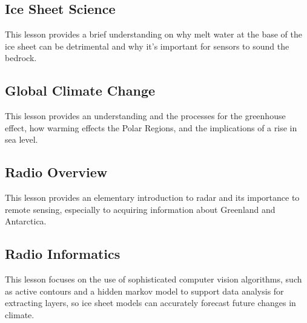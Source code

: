 \subsection{Ice Sheet Science}\label{ice-sheet-science}

This lesson provides a brief understanding on why melt water at the base
of the ice sheet can be detrimental and why it's important for sensors
to sound the bedrock.


\subsection{Global Climate Change}\label{global-climate-change}

This lesson provides an understanding and the processes for the
greenhouse effect, how warming effects the Polar Regions, and the
implications of a rise in sea level.


\subsection{Radio Overview}\label{radio-overview}

This lesson provides an elementary introduction to radar and its
importance to remote sensing, especially to acquiring information about
Greenland and Antarctica.


\subsection{Radio Informatics}\label{radio-informatics}

This lesson focuses on the use of sophisticated computer vision
algorithms, such as active contours and a hidden markov model to support
data analysis for extracting layers, so ice sheet models can accurately
forecast future changes in climate.

